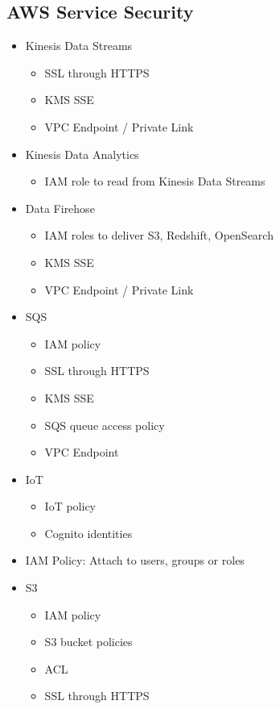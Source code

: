 \documentclass[../../main.tex]{subfiles}
\begin{document}
\subsection{AWS Service Security}
\begin{itemize}
    \item Kinesis Data Streams
    \begin{itemize}
        \item SSL through HTTPS
        \item KMS SSE
        \item VPC Endpoint / Private Link
    \end{itemize}
    \item Kinesis Data Analytics
    \begin{itemize}
        \item IAM role to read from Kinesis Data Streams
    \end{itemize}
    \item Data Firehose
    \begin{itemize}
        \item IAM roles to deliver S3, Redshift, OpenSearch
        \item KMS SSE
        \item VPC Endpoint / Private Link
    \end{itemize}
    \item SQS
    \begin{itemize}
        \item IAM policy
        \item SSL through HTTPS
        \item KMS SSE
        \item SQS queue access policy
        \item VPC Endpoint
    \end{itemize}
    \item IoT
    \begin{itemize}
        \item IoT policy
        \item Cognito identities
    \end{itemize}
    \item IAM Policy: Attach to users, groups or roles
    \item S3
    \begin{itemize}
        \item IAM policy
        \item S3 bucket policies
        \item ACL
        \item SSL through HTTPS

\end{itemize}
\end{itemize}
\end{document}
